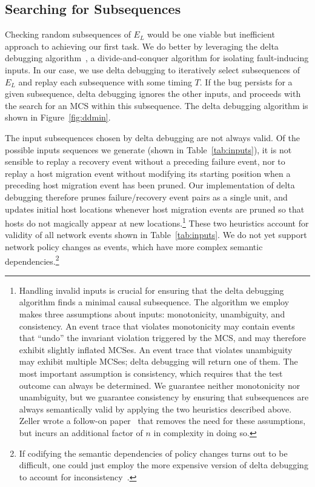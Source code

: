\subsection{Searching for Subsequences}
\label{subsec:delta_debugging}

Checking random subsequences of $E_L$ would be one viable but inefficient
approach to achieving our first task. We do better by leveraging
the delta debugging algorithm~\cite{Zeller:1999:YMP:318773.318946}, a
divide-and-conquer algorithm for
isolating fault-inducing inputs. In our case, we use delta
debugging to iteratively select subsequences of $E_L$ and replay each
subsequence with some timing $T$. If the bug persists for a given subsequence, delta debugging ignores the
other inputs, and proceeds with the search for an MCS within this subsequence.
The delta debugging algorithm is shown in Figure~\ref{fig:ddmin}.

The input subsequences chosen by delta debugging are not always
valid. Of the possible inputs sequences we generate (shown in
Table~\ref{tab:inputs}), it is not sensible to replay a recovery event without a
preceding failure event, nor to replay a host migration
event without modifying its starting position when a preceding host
migration event has been pruned. Our implementation of delta debugging
therefore prunes failure/recovery event pairs as a single unit, and updates initial host locations
whenever host migration events are pruned so that hosts do not magically appear at new
locations.\footnote{Handling invalid inputs is crucial for
ensuring that the delta debugging algorithm finds a minimal causal
subsequence. The algorithm we employ~\cite{Zeller:1999:YMP:318773.318946}
makes three
assumptions about inputs: monotonicity, unambiguity, and consistency.
An event trace that violates monotonicity may contain events that ``undo'' the
invariant violation triggered by the MCS, and may therefore exhibit slightly
inflated MCSes. An event trace that violates unambiguity may exhibit multiple MCSes; delta debugging
will return one of them. The most important assumption is consistency, which
requires that the test outcome can always be determined.
We guarantee neither monotonicity nor unambiguity, but we guarantee consistency by
ensuring that subsequences are always semantically valid by applying the two
heuristics described above. Zeller wrote a follow-on
paper~\cite{Zeller:2002:SIF:506201.506206} that removes the need for these
assumptions, but incurs an additional factor of $n$ in complexity in doing so.}
These two heuristics account for validity of all network
events shown in Table~\ref{tab:inputs}. We do not yet
support network policy changes as events, which have more complex semantic
dependencies.\footnote{If codifying the semantic dependencies of
policy changes turns out to be difficult, one could just employ the more
expensive version of delta debugging to account for
inconsistency~\cite{Zeller:2002:SIF:506201.506206}.}

